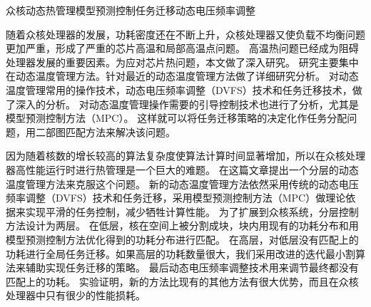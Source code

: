 
\begin{Cabstract}{众核}{动态热管理}{模型预测控制}{任务迁移}{动态电压频率调整}

随着众核处理器的发展，功耗密度还在不断上升，众核处理器又使负载不均衡问题更加严重，形成了严重的芯片高温和局部高温点问题。
高温热问题已经成为阻碍处理器发展的重要因素。为应对芯片热问题，本文做了深入研究。
研究主要集中在动态温度管理方法。针对最近的动态温度管理方法做了详细研究分析。
对动态温度管理常用的操作技术，动态电压频率调整（DVFS）技术和任务迁移技术，做了深入的分析。
对动态温度管理操作需要的引导控制技术也进行了分析，尤其是模型预测控制方法（MPC）。
这样就可以将任务迁移策略的决定化作任务分配问题，用二部图匹配方法来解决该问题。

因为随着核数的增长较高的算法复杂度使算法计算时间显著增加，所以在众核处理器高性能运行时进行热管理是一个巨大的难题。
在这篇文章提出一个分层的动态温度管理方法来克服这个问题。
新的动态温度管理方法依然采用传统的动态电压频率调整（DVFS）技术和任务迁移，采用模型预测控制方法（MPC）做理论依据来实现平滑的任务控制，减少牺牲计算性能。
为了扩展到众核系统，分层控制方法设计为两层。
在低层，核在空间上被分割成块，块内用现有的功耗分布和用模型预测控制方法优化得到的功耗分布进行匹配。
在高层，对低层没有匹配上的功耗进行全局任务迁移。如果高层的功耗数量很大，我们采用改进的迭代最小割算法来辅助实现任务迁移的策略。
最后动态电压频率调整技术用来调节最终都没有匹配上的功耗。
实验证明，新的方法比现有的其他方法有很大优势，而且在众核处理器中只有很少的性能损耗。
\end{Cabstract}
